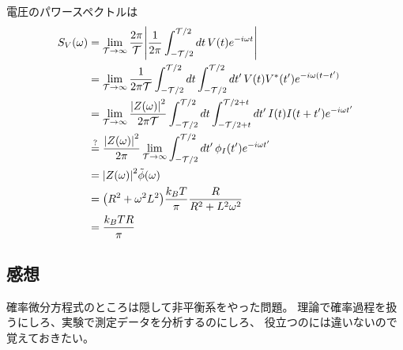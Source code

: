 \documentclass[../../master.tex]{subfiles}
\begin{document}
\subsection{}
電圧のパワースペクトルは
\begin{equation}\begin{aligned}[b]
    S_V(\omega)
    &= \lim_{\mathcal{T}\to\infty}\frac{2\pi}{\mathcal{T}}\abs{\frac{1}{2\pi}\int_{-\mathcal{T}/2}^{\mathcal{T}/2}
    dt\,V(t)e^{-i\omega t}}\\
    &= \lim_{\mathcal{T}\to\infty}\frac{1}{2\pi \mathcal{T}} \int_{-\mathcal{T}/2}^{\mathcal{T}/2}dt\int_{-\mathcal{T}/2}^{\mathcal{T}/2}dt'\,
    V(t)V^*(t')e^{-i\omega(t-t')}\\
    &= \lim_{\mathcal{T}\to\infty}\frac{\abs{Z(\omega)}^2}{2\pi \mathcal{T}} \int_{-\mathcal{T}/2}^{\mathcal{T}/2}dt\int_{-\mathcal{T}/2+t}^{\mathcal{T}/2+t}dt'\,
    I(t)I(t+t')e^{-i\omega t'}\\
    &\overset{?}{=} \frac{\abs{Z(\omega)}^2}{2\pi}\lim_{\mathcal{T}\to\infty}\int_{-\mathcal{T}/2}^{\mathcal{T}/2}dt'\,\phi_I(t')e^{-i\omega t'}\\
    &= \abs{Z(\omega)}^2\tilde{\phi}(\omega)\\
    &= \qty(R^2+\omega^2 L^2)\frac{k_BT}{\pi} \frac{R}{R^2+L^2\omega^2}\\
    &= \frac{k_BT R}{\pi}
\end{aligned}\end{equation}


\subsection*{感想}
確率微分方程式のところは隠して非平衡系をやった問題。
理論で確率過程を扱うにしろ、実験で測定データを分析するのにしろ、
役立つのには違いないので覚えておきたい。
\end{document}
